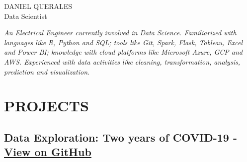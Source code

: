 \documentclass[5pt]{article} %
\def\myname{DANIEL QUERALES}
\def\position{Data Scientist}
\begin{document}
\thispagestyle{empty}

\begin{center}
{\Huge \myname} \\ %
{\large \position}
\end{center}


\emph{An Electrical Engineer currently involved in Data Science. Familiarized with languages like R, Python and SQL; tools like Git, Spark, Flask, Tableau, Excel and Power BI; knowledge with cloud platforms like Microsoft Azure, GCP and AWS. Experienced with data activities like cleaning, transformation, analysis, prediction and visualization.}

%

\section*{PROJECTS}

\subsection*{Data Exploration: Two years of COVID-19 - \href{https://dquerales.github.io/DanielPortfolio/two_years_of_covid.html}{View on GitHub}}
 
\end{document}
